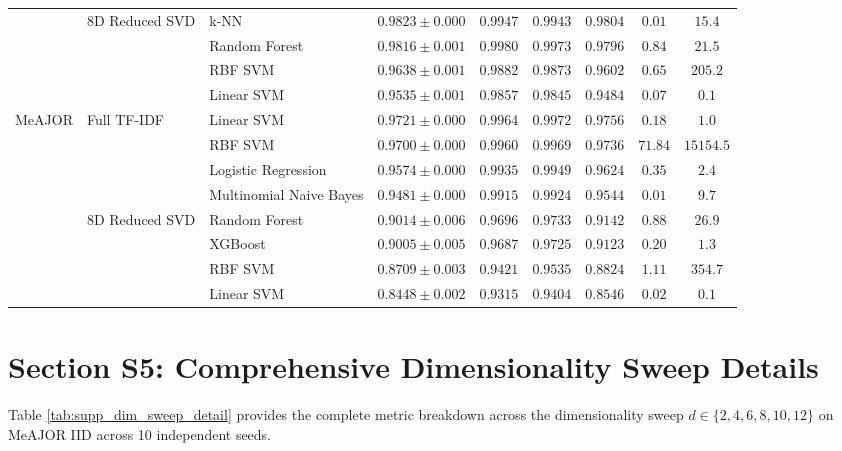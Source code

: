 \documentclass[10pt,letterpaper]{article}
\begin{document}
\begin{table}[h!]
\begin{tabular}{lllcccccc}
\cmidrule{2-9}
 & \multirow{4}{*}{8D Reduced SVD} & k-NN & $\mathbf{0.9823} \pm 0.000$ & $0.9947$ & $0.9943$ & $0.9804$ & $0.01$ & $15.4$ \\
 & & Random Forest & $0.9816 \pm 0.001$ & $0.9980$ & $0.9973$ & $0.9796$ & $0.84$ & $21.5$ \\
 & & RBF SVM & $0.9638 \pm 0.001$ & $0.9882$ & $0.9873$ & $0.9602$ & $0.65$ & $205.2$ \\
 & & Linear SVM & $0.9535 \pm 0.001$ & $0.9857$ & $0.9845$ & $0.9484$ & $0.07$ & $0.1$ \\
\midrule
\multirow{8}{*}{MeAJOR} & \multirow{4}{*}{Full TF-IDF} & Linear SVM & $\mathbf{0.9721} \pm 0.000$ & $0.9964$ & $0.9972$ & $0.9756$ & $0.18$ & $1.0$ \\
 & & RBF SVM & $0.9700 \pm 0.000$ & $0.9960$ & $0.9969$ & $0.9736$ & $71.84$ & $15154.5$ \\
 & & Logistic Regression & $0.9574 \pm 0.000$ & $0.9935$ & $0.9949$ & $0.9624$ & $0.35$ & $2.4$ \\
 & & Multinomial Naive Bayes & $0.9481 \pm 0.000$ & $0.9915$ & $0.9924$ & $0.9544$ & $0.01$ & $9.7$ \\
\cmidrule{2-9}
 & \multirow{4}{*}{8D Reduced SVD} & Random Forest & $\mathbf{0.9014} \pm 0.006$ & $0.9696$ & $0.9733$ & $0.9142$ & $0.88$ & $26.9$ \\
 & & XGBoost & $0.9005 \pm 0.005$ & $0.9687$ & $0.9725$ & $0.9123$ & $0.20$ & $1.3$ \\
 & & RBF SVM & $0.8709 \pm 0.003$ & $0.9421$ & $0.9535$ & $0.8824$ & $1.11$ & $354.7$ \\
 & & Linear SVM & $0.8448 \pm 0.002$ & $0.9315$ & $0.9404$ & $0.8546$ & $0.02$ & $0.1$ \\
\bottomrule
\end{tabular}
\end{table}

\section{Section S5: Comprehensive Dimensionality Sweep Details}
\label{sec:supp_dim_sweep}

Table \ref{tab:supp_dim_sweep_detail} provides the complete metric breakdown across the dimensionality sweep $d \in \{2, 4, 6, 8, 10, 12\}$ on MeAJOR IID across 10 independent seeds.
\end{document}
